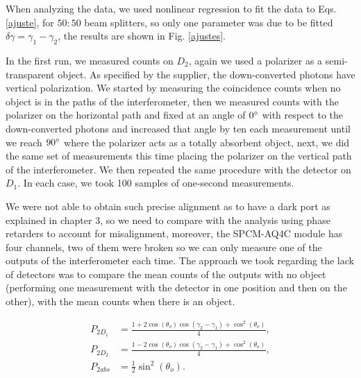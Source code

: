 \documentclass[12pt]{book}
\begin{document}
When analyzing the data, we used nonlinear regression to fit the data to Eqs. \ref{ajuste}, for $50:50$ beam splitters, so only one parameter was due to be fitted $\delta\gamma=\gamma_{1}-\gamma_{2}$, the results are shown in Fig. \ref{ajustes}.

In the first run, we measured counts on $D_{2}$, again we used a polarizer as a semi-transparent object. As specified by the supplier, the down-converted photons have vertical polarization. We started by measuring the coincidence counts when no object is in the paths of the interferometer, then we measured counts with the polarizer on the horizontal path and fixed at an angle of $0\degree$ with respect to the down-converted photons and increased that angle by ten each measurement until we reach $90\degree$ where the polarizer acts as a totally absorbent object, next, we did the same set of measurements this time placing the polarizer on the vertical path of the interferometer. We then repeated the same procedure with the detector on $D_{1}$. In each case, we took 100 samples of one-second measurements.


 We were not able to obtain such precise alignment as to have a dark port as explained in chapter 3, so we need to compare with the analysis using phase retarders to account for misalignment, moreover, the SPCM-AQ4C module has four channels, two of them were broken so we can only measure one of the outputs of the interferometer each time. The approach we took regarding the lack of detectors was to compare the mean counts of the outputs with no object (performing one measurement with the detector in one position and then on the other), with the mean counts when there is an object.
 

\begin{align*}
 P_{2D_{1}}&=\frac{1+2\cos(\theta_{o})\cos(\gamma_{2}-\gamma_{1})+\cos^{2}(\theta_{o})}{4},\\
 P_{2D_{2}}&=\frac{1-2\cos(\theta_{o})\cos(\gamma_{2}-\gamma_{1})+\cos^{2}(\theta_{o})}{4},\\
 P_{2abs}&=\frac{1}{2}\sin^{2}(\theta_{o}).
\end{align*}
\end{document}
